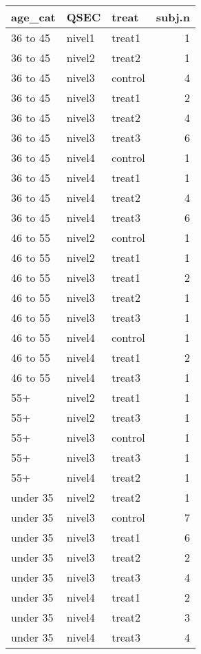 \begin{tabular}{lllr}
  \hline
age\_cat & QSEC & treat & subj.n \\ 
  \hline
36 to 45 & nivel1 & treat1 &   1 \\ 
  36 to 45 & nivel2 & treat2 &   1 \\ 
  36 to 45 & nivel3 & control &   4 \\ 
  36 to 45 & nivel3 & treat1 &   2 \\ 
  36 to 45 & nivel3 & treat2 &   4 \\ 
  36 to 45 & nivel3 & treat3 &   6 \\ 
  36 to 45 & nivel4 & control &   1 \\ 
  36 to 45 & nivel4 & treat1 &   1 \\ 
  36 to 45 & nivel4 & treat2 &   4 \\ 
  36 to 45 & nivel4 & treat3 &   6 \\ 
  46 to 55 & nivel2 & control &   1 \\ 
  46 to 55 & nivel2 & treat1 &   1 \\ 
  46 to 55 & nivel3 & treat1 &   2 \\ 
  46 to 55 & nivel3 & treat2 &   1 \\ 
  46 to 55 & nivel3 & treat3 &   1 \\ 
  46 to 55 & nivel4 & control &   1 \\ 
  46 to 55 & nivel4 & treat1 &   2 \\ 
  46 to 55 & nivel4 & treat3 &   1 \\ 
  55+ & nivel2 & treat1 &   1 \\ 
  55+ & nivel2 & treat3 &   1 \\ 
  55+ & nivel3 & control &   1 \\ 
  55+ & nivel3 & treat3 &   1 \\ 
  55+ & nivel4 & treat2 &   1 \\ 
  under 35 & nivel2 & treat2 &   1 \\ 
  under 35 & nivel3 & control &   7 \\ 
  under 35 & nivel3 & treat1 &   6 \\ 
  under 35 & nivel3 & treat2 &   2 \\ 
  under 35 & nivel3 & treat3 &   4 \\ 
  under 35 & nivel4 & treat1 &   2 \\ 
  under 35 & nivel4 & treat2 &   3 \\ 
  under 35 & nivel4 & treat3 &   4 \\ 
   \hline
\end{tabular}

